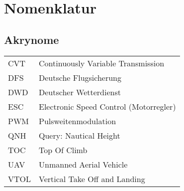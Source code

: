 %
\chapter*{Nomenklatur}
%
%
\section*{Akrynome}
\begin{longtable}{lp{13cm}}
	CVT & Continuously Variable Transmission \\
	DFS & Deutsche Flugsicherung \\
	DWD & Deutscher Wetterdienst \\
	ESC & Electronic Speed Control (Motorregler)\\
	PWM & Pulsweitenmodulation \\
	QNH & Query: Nautical Height\\
	TOC & Top Of Climb\\
	UAV & Unmanned Aerial Vehicle\\
	VTOL & Vertical Take Off and Landing
\end{longtable}
%
